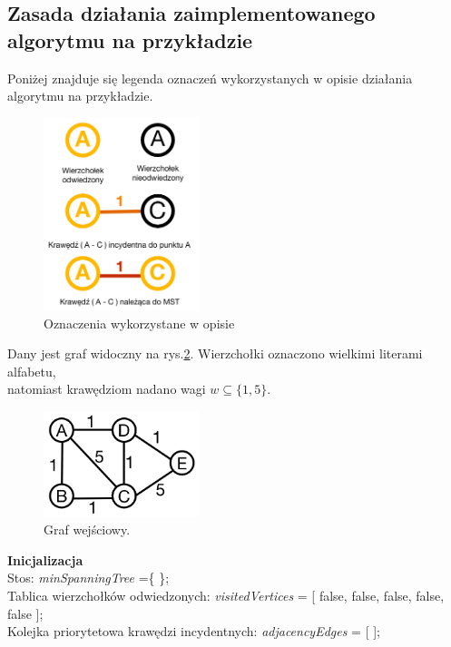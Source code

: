 \newpage
\subsection{Zasada działania zaimplementowanego algorytmu na przykładzie}
Poniżej znajduje się legenda oznaczeń wykorzystanych w opisie działania algorytmu na przykładzie.

\begin{figure}[htb!]
	\centering
	\includegraphics[width=0.4\textwidth]{tex/fig/legenda}
	\caption{Oznaczenia wykorzystane w opisie}
	\label{fig: legenda}
\end{figure}

Dany jest graf widoczny na rys.\ref{fig: g1}.  Wierzchołki oznaczono wielkimi literami alfabetu,\\ natomiast krawędziom nadano wagi $w\subseteq \{1,5\}$.\\

\begin{figure}[htb!]
	\centering
	\includegraphics[width=0.4\textwidth]{tex/fig/graf1}
	\caption{Graf wejściowy.}
	\label{fig: g1}
\end{figure}

\newpage
\textbf{Inicjalizacja}\\
Stos: \emph{minSpanningTree} =\{ \};\\
Tablica wierzchołków odwiedzonych: \emph{visitedVertices} = [ false, false, false, false, false ];\\
Kolejka priorytetowa krawędzi incydentnych: \emph{adjacencyEdges} = [ ];

